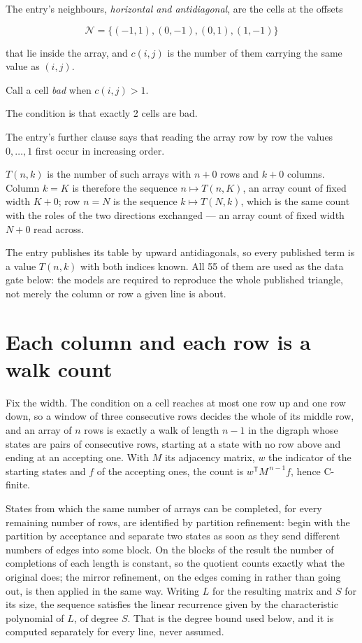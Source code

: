 \documentclass[11pt]{article}
\theoremstyle{definition}
\begin{document}
The entry's neighbours, {\itshape horizontal and antidiagonal}, are the cells at the offsets

\[\mathcal{N} = \{(-1,1), (0,-1), (0,1), (1,-1)\}\]

that lie inside the array, and $c(i,j)$ is the number of them carrying the same value as $(i,j)$.

Call a cell {\itshape bad} when $c(i,j) > 1$.

The condition is that exactly 2 cells are bad.

The entry's further clause says that reading the array row by row the values $0,\dots,1$ first occur in increasing order.

$T(n,k)$ is the number of such arrays with $n + 0$ rows and $k + 0$ columns. Column $k = K$ is therefore the sequence $n \mapsto T(n,K)$, an array count of fixed width $K + 0$; row $n = N$ is the sequence $k \mapsto T(N,k)$, which is the same count with the roles of the two directions exchanged --- an array count of fixed width $N + 0$ read across.

The entry publishes its table by upward antidiagonals, so every published term is a value $T(n,k)$ with both indices known. All 55 of them are used as the data gate below: the models are required to reproduce the whole published triangle, not merely the column or row a given line is about.

\section{Each column and each row is a walk count}

Fix the width. The condition on a cell reaches at most one row up and one row down, so a window of three consecutive rows decides the whole of its middle row, and an array of $n$ rows is exactly a walk of length $n-1$ in the digraph whose states are pairs of consecutive rows, starting at a state with no row above and ending at an accepting one. With $M$ its adjacency matrix, $w$ the indicator of the starting states and $f$ of the accepting ones, the count is $w^{\mathsf T}M^{\,n-1}f$, hence C-finite.

States from which the same number of arrays can be completed, for every remaining number of rows, are identified by partition refinement: begin with the partition by acceptance and separate two states as soon as they send different numbers of edges into some block. On the blocks of the result the number of completions of each length is constant, so the quotient counts exactly what the original does; the mirror refinement, on the edges coming in rather than going out, is then applied in the same way. Writing $L$ for the resulting matrix and $S$ for its size, the sequence satisfies the linear recurrence given by the characteristic polynomial of $L$, of degree $S$. That is the degree bound used below, and it is computed separately for every line, never assumed.
\end{document}
